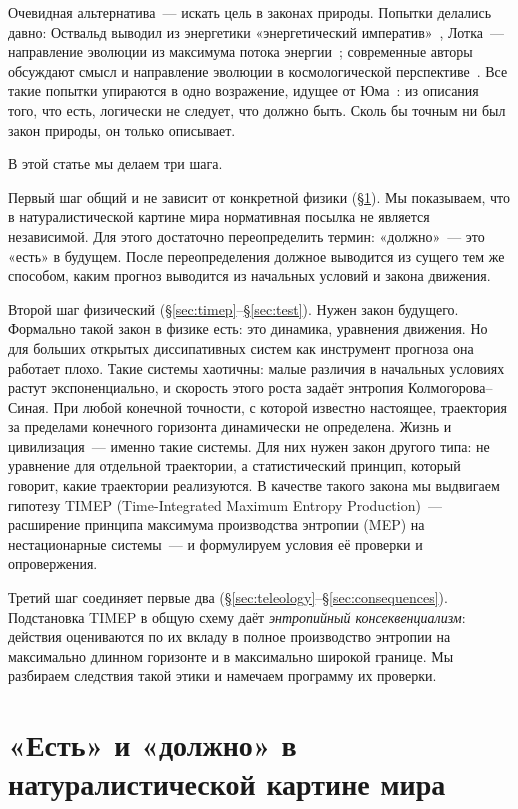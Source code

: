\documentclass[11pt,a4paper]{article}
\newcommand{\Sref}[1]{\hyperref[#1]{\S\ref{#1}}}
\begin{document}
Очевидная альтернатива~--- искать цель в законах природы. Попытки делались давно: Оствальд выводил из энергетики «энергетический императив»~\cite{ostwald1912}, Лотка~--- направление эволюции из максимума потока энергии~\cite{lotka1922}; современные авторы обсуждают смысл и направление эволюции в космологической перспективе~\cite{vidal2014,stewart2026}. Все такие попытки упираются в одно возражение, идущее от Юма~\cite{hume1739}: из описания того, что есть, логически не следует, что должно быть. Сколь бы точным ни был закон природы, он только описывает.

В этой статье мы делаем три шага.

Первый шаг общий и не зависит от конкретной физики (\Sref{sec:isought}). Мы показываем, что в натуралистической картине мира нормативная посылка не является независимой. Для этого достаточно переопределить термин: «должно»~--- это «есть» в будущем. После переопределения должное выводится из сущего тем же способом, каким прогноз выводится из начальных условий и закона движения.

Второй шаг физический (\Sref{sec:timep}--\Sref{sec:test}). Нужен закон будущего. Формально такой закон в физике есть: это динамика, уравнения движения. Но для больших открытых диссипативных систем как инструмент прогноза она работает плохо. Такие системы хаотичны: малые различия в начальных условиях растут экспоненциально, и скорость этого роста задаёт энтропия Колмогорова--Синая. При любой конечной точности, с которой известно настоящее, траектория за пределами конечного горизонта динамически не определена. Жизнь и цивилизация~--- именно такие системы. Для них нужен закон другого типа: не уравнение для отдельной траектории, а статистический принцип, который говорит, какие траектории реализуются. В качестве такого закона мы выдвигаем гипотезу TIMEP (Time-Integrated Maximum Entropy Production)~--- расширение принципа максимума производства энтропии (MEP) на нестационарные системы~--- и формулируем условия её проверки и опровержения.

Третий шаг соединяет первые два (\Sref{sec:teleology}--\Sref{sec:consequences}). Подстановка TIMEP в общую схему даёт \emph{энтропийный консеквенциализм}: действия оцениваются по их вкладу в полное производство энтропии на максимально длинном горизонте и в максимально широкой границе. Мы разбираем следствия такой этики и намечаем программу их проверки.

\section{«Есть» и «должно» в натуралистической картине мира}\label{sec:isought}
\end{document}
